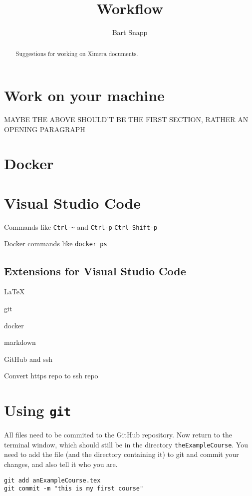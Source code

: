 \documentclass{ximera}
\title{Workflow}
\author{Bart Snapp}
\begin{document}
\begin{abstract}
    Suggestions for working on Ximera documents.
\end{abstract}
\maketitle

\section{Work on your machine}

MAYBE THE ABOVE SHOULD'T BE THE FIRST SECTION, RATHER AN OPENING PARAGRAPH



\section{Docker}



\section{Visual Studio Code}
Commands like \verb!Ctrl-~! and \verb!Ctrl-p! \verb!Ctrl-Shift-p!

Docker commands like
\verb!docker ps!

\subsection{Extensions for Visual Studio Code}

\LaTeX

git

docker

markdown



GitHub and ssh

Convert https repo to ssh repo




\section{Using \texttt{git}}

All files need to be commited to the GitHub repository.
Now return to the terminal window, which should still be in the
directory
\verb!theExampleCourse!. You need to add the file (and the directory
containing
it) to git and commit your changes, and also tell it who you are.
\begin{verbatim}
git add anExampleCourse.tex
git commit -m "this is my first course"
\end{verbatim}
\end{document}
